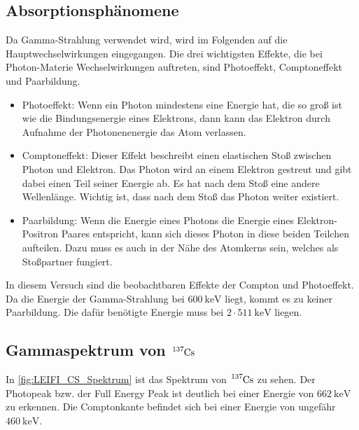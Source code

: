 \subsection{Absorptionsphänomene}
Da Gamma-Strahlung verwendet wird, wird im Folgenden auf die Hauptwechselwirkungen eingegangen.
Die drei wichtigsten Effekte, die bei Photon-Materie Wechselwirkungen auftreten, sind Photoeffekt, Comptoneffekt und Paarbildung.
\begin{itemize}
    \item   Photoeffekt: Wenn ein Photon mindestens eine Energie hat, die so groß ist wie die Bindungsenergie eines Elektrons, dann kann das Elektron durch Aufnahme der Photonenenergie das Atom verlassen.
    
    \item   Comptoneffekt: Dieser Effekt beschreibt einen elastischen Stoß zwischen Photon und Elektron.
            Das Photon wird an einem Elektron gestreut und gibt dabei einen Teil seiner Energie ab.
            Es hat nach dem Stoß eine andere Wellenlänge. Wichtig ist, dass nach dem Stoß das Photon weiter existiert.
    
    \item   Paarbildung: Wenn die Energie eines Photons die Energie eines Elektron-Positron Paares entspricht, kann sich dieses Photon in diese beiden Teilchen aufteilen.
            Dazu muss es auch in der Nähe des Atomkerns sein, welches als Stoßpartner fungiert. 
    
\end{itemize}

\noindent
In diesem Versuch sind die beobachtbaren Effekte der Compton und Photoeffekt.
Da die Energie der Gamma-Strahlung bei $\SI{600}{\kilo\electronvolt}$ liegt, kommt es zu keiner Paarbildung.
Die dafür benötigte Energie muss bei $2 \cdot \SI{511}{\kilo\electronvolt}$ liegen.

\subsection{Gammaspektrum von $\ce{^{137}Cs}$}
In \autoref{fig:LEIFI_CS_Spektrum} ist das Spektrum von $\ce{^{137}Cs}$ zu sehen.
Der Photopeak bzw. der Full Energy Peak ist deutlich bei einer Energie von $\SI{662}{\kilo\electronvolt}$ zu erkennen.
Die Comptonkante befindet sich bei einer Energie von ungefähr $\SI{460}{\kilo\electronvolt}$.

